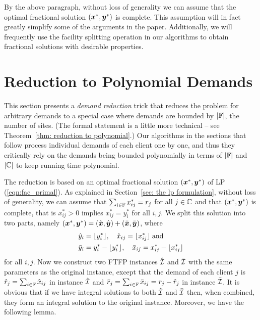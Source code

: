 \documentclass[11pt]{article}
\begin{document}
By the above paragraph,  without loss of generality we can
assume that the optimal fractional solution $(\boldsymbol{x}^\ast, \boldsymbol{y}^\ast)$
is complete. This assumption will in fact greatly simplify some of
the arguments in the paper. Additionally, we will frequently use the facility
splitting operation in our algorithms to obtain fractional solutions with
desirable properties.



\section{Reduction to Polynomial Demands}
\label{sec: polynomial demands}

This section presents a \emph{demand reduction} trick that
reduces the problem for arbitrary demands to a special case
where demands are bounded by $|\mathbb{F}|$, the number of
sites.  (The formal statement is a little more technical --
see Theorem~\ref{thm: reduction to polynomial}.)  Our
algorithms in the sections that follow process individual
demands of each client one by one, and thus they critically
rely on the demands being bounded polynomially in terms of
$|\mathbb{F}|$ and $|\mathbb{C}|$ to keep running time
polynomial.

The reduction is based on an optimal fractional solution
$(\boldsymbol{x}^\ast,\boldsymbol{y}^\ast)$ of LP (\ref{eqn:fac_primal}). As explained in
Section~\ref{sec: the lp formulation}, without loss
of generality, we can assume that $\sum_{i\in\mathbb{F}} x^\ast_{ij} = r_j$ for all 
$j\in\mathbb{C}$ and that $(\boldsymbol{x}^\ast,\boldsymbol{y}^\ast)$ is complete, that is
$x^\ast_{ij} > 0$ implies $x^\ast_{ij} = y^\ast_i$ for all $i,j$. 
We split this solution into two parts, namely
$(\boldsymbol{x}^\ast,\boldsymbol{y}^\ast) = (\hat{\boldsymbol{x}},\hat{\boldsymbol{y}})+ (\bar{\boldsymbol{x}},\bar{\boldsymbol{y}})$, where
%
\begin{align*}
{\hat y}_i &= { \lfloor y_i^\ast \rfloor }, \quad
			{\hat x}_{ij} = { \lfloor x_{ij}^\ast \rfloor } \;\textrm{and}
			\\
{\bar y}_i &= y_i^\ast - { \lfloor y_i^\ast \rfloor }, \quad
 	{\bar x}_{ij} = x_{ij}^\ast -  { \lfloor x_{ij}^\ast \rfloor }
\end{align*}
%
for all $i,j$. Now we construct two
FTFP instances ${\hat{\cal I}}$ and ${\bar{\cal I}}$ with the same
parameters as the original instance, except that the demand of each client $j$ is
${\hat r}_j = \sum_{i\in\mathbb{F}} {\hat x}_{ij}$ in instance ${\hat{\cal I}}$ and
${\bar r}_j = \sum_{i\in\mathbb{F}} {\bar x}_{ij} = r_j - {\hat r}_j$ in instance ${\bar{\cal I}}$. 
It is obvious that if we have integral solutions to both ${\hat{\cal I}}$
and ${\bar{\cal I}}$ then, when combined, they form an integral
solution to the original instance.  Moreover, we have the
following lemma.
\end{document}
